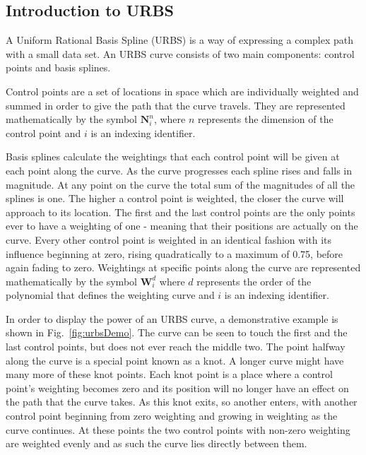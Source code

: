 \subsection{Introduction to URBS}
A Uniform Rational Basis Spline (URBS) is a way of expressing a complex path with a small data set. An URBS curve consists of two main components: control points and basis splines.

Control points are a set of locations in space which are individually weighted and summed in order to give the path that the curve travels. They are represented mathematically by the symbol $\textbf{N}^n_i$, where $n$ represents the dimension of the control point and $i$ is an indexing identifier.

Basis splines calculate the weightings that each control point will be given at each point along the curve. As the curve progresses each spline rises and falls in magnitude. At any point on the curve the total sum of the magnitudes of all the splines is one.
The higher a control point is weighted, the closer the curve will approach to its location. The first and the last control points are the only points ever to have a weighting of one - meaning that their positions are actually on the curve. Every other control point is weighted in an identical fashion with its influence beginning at zero, rising quadratically to a maximum of 0.75, before again fading to zero. Weightings at specific points along the curve are represented mathematically by the symbol $\textbf{W}_i^d$ where $d$ represents the order of the polynomial that defines the weighting curve and $i$ is an indexing identifier.

In order to display the power of an URBS curve, a demonstrative example is shown in Fig.~\ref{fig:urbsDemo}. The curve can be seen to touch the first and the last control points, but does not ever reach the middle two. The point halfway along the curve is a special point known as a 
knot. A longer curve might have many more of these knot points. Each knot point is a place where a control point's weighting becomes zero and its position will no longer have an effect on the path that the curve takes. As this knot exits, so another enters, with another control point beginning from zero weighting and growing in weighting as the curve continues. At these points the two control points with non-zero weighting are weighted evenly and as such the curve lies directly between them.

